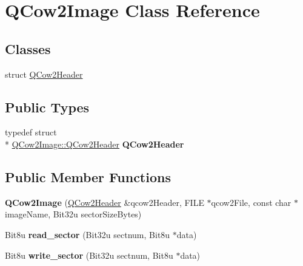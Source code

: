 \hypertarget{classQCow2Image}{\section{Q\-Cow2\-Image Class Reference}
\label{classQCow2Image}
}
\subsection*{Classes}
\begin{DoxyCompactItemize}
\item 
struct \hyperlink{structQCow2Image_1_1QCow2Header}{Q\-Cow2\-Header}
\end{DoxyCompactItemize}
\subsection*{Public Types}
\begin{DoxyCompactItemize}
\item 
\hypertarget{classQCow2Image_a91ffff9040ea06b3ead51fc720534e0c}{typedef struct \\*
\hyperlink{structQCow2Image_1_1QCow2Header}{Q\-Cow2\-Image\-::\-Q\-Cow2\-Header} {\bfseries Q\-Cow2\-Header}}\label{classQCow2Image_a91ffff9040ea06b3ead51fc720534e0c}

\end{DoxyCompactItemize}
\subsection*{Public Member Functions}
\begin{DoxyCompactItemize}
\item 
\hypertarget{classQCow2Image_a36c1d3968eb728e4fed1b188a2f96b3d}{{\bfseries Q\-Cow2\-Image} (\hyperlink{structQCow2Image_1_1QCow2Header}{Q\-Cow2\-Header} \&qcow2\-Header, F\-I\-L\-E $\ast$qcow2\-File, const char $\ast$image\-Name, Bit32u sector\-Size\-Bytes)}\label{classQCow2Image_a36c1d3968eb728e4fed1b188a2f96b3d}

\item 
\hypertarget{classQCow2Image_a3611df48057795bd0dc7283e5c16489d}{Bit8u {\bfseries read\-\_\-sector} (Bit32u sectnum, Bit8u $\ast$data)}\label{classQCow2Image_a3611df48057795bd0dc7283e5c16489d}

\item 
\hypertarget{classQCow2Image_abff01750b375bf45c3437e0af94b69c7}{Bit8u {\bfseries write\-\_\-sector} (Bit32u sectnum, Bit8u $\ast$data)}\label{classQCow2Image_abff01750b375bf45c3437e0af94b69c7}

\end{DoxyCompactItemize}
